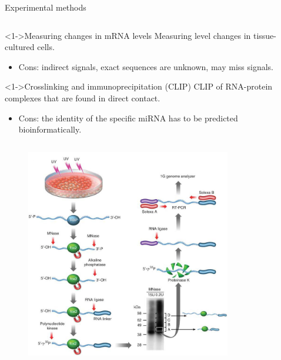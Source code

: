 \documentclass{beamer}
\begin{document}
\begin{frame}{Experimental methods}
	\begin{column}{0.65\textwidth}
		\begin{exampleblock}
			<1->{Measuring changes in mRNA levels}
			Measuring level changes in tissue-cultured cells.
			\begin{itemize}
				\item Cons: indirect signals, exact sequences are unknown, may miss signals.
			\end{itemize}
		\end{exampleblock}
		\begin{exampleblock}
			<1->{Crosslinking and immunoprecipitation (CLIP)}
			CLIP of RNA-protein complexes that are found in direct contact.
			\begin{itemize}
				\item Cons: the identity of the specific miRNA has to be predicted bioinformatically.
			\end{itemize}
		\end{exampleblock}
	\end{column}
	\begin{column}{0.35\textwidth}
		\begin{figure}[hb!]
			\centering
			\includegraphics[width=0.8\textwidth]{images/Crosslinking-and-Immunoprecipitation-(CLIP)-2.jpg}
		\end{figure}
	\end{column}
\end{frame}
\end{document}
